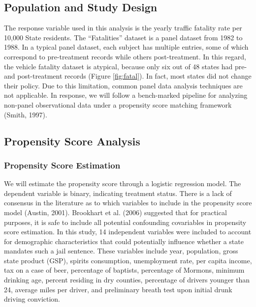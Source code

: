 \documentclass[]{article}
\begin{document}
\hypertarget{population-and-study-design}{%
\subsection{Population and Study Design}\label{population-and-study-design}}

The response variable used in this analysis is the yearly traffic fatality rate per 10,000 State residents. The ``Fatalities'' dataset is a panel dataset from 1982 to 1988. In a typical panel dataset, each subject has multiple entries, some of which correspond to pre-treatment records while others post-treatment. In this regard, the vehicle fatality dataset is atypical, because only six out of 48 states had pre- and post-treatment records (Figure \ref{fig:fatal}). In fact, most states did not change their policy. Due to this limitation, common panel data analysis techniques are not applicable. In response, we will follow a bench-marked pipeline for analyzing non-panel observational data under a propensity score matching framework (Smith, 1997).

\hypertarget{propensity-score-analysis}{%
\subsection{Propensity Score Analysis}\label{propensity-score-analysis}}

\hypertarget{propensity-score-estimation}{%
\subsubsection{Propensity Score Estimation}\label{propensity-score-estimation}}

We will estimate the propensity score through a logistic regression model. The dependent variable is binary, indicating treatment status. There is a lack of consensus in the literature as to which variables to include in the propensity score model (Austin, 2001). Brookhart et al. (2006) suggested that for practical purposes, it is safe to include all potential confounding covariables in propensity score estimation. In this study, 14 independent variables were included to account for demographic characteristics that could potentially influence whether a state mandates such a jail sentence. These variables include year, population, gross state product (GSP), spirits consumption, unemployment rate, per capita income, tax on a case of beer, percentage of baptists, percentage of Mormons, minimum drinking age, percent residing in dry counties, percentage of drivers younger than 24, average miles per driver, and preliminary breath test upon initial drunk driving conviction.
\end{document}
